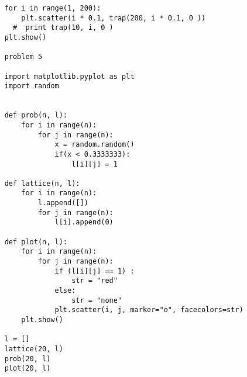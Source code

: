 \documentclass[a4paper]{article}
\begin{document}
\begin{verbatim}
    for i in range(1, 200):
        plt.scatter(i * 0.1, trap(200, i * 0.1, 0 ))
      #  print trap(10, i, 0 )
    plt.show()
    
    problem 5
    
    import matplotlib.pyplot as plt
    import random
    
    
    def prob(n, l):
        for i in range(n):
            for j in range(n):
                x = random.random()
                if(x < 0.3333333):
                    l[i][j] = 1
    
    def lattice(n, l):
        for i in range(n):
            l.append([])
            for j in range(n):
                l[i].append(0)
    
    def plot(n, l):
        for i in range(n):
            for j in range(n):
                if (l[i][j] == 1) :
                    str = "red"
                else:
                    str = "none"
                plt.scatter(i, j, marker="o", facecolors=str)
        plt.show()
    
    l = []
    lattice(20, l)
    prob(20, l)
    plot(20, l)
    
    
    
    
    \end{verbatim}
    
\end{document}

